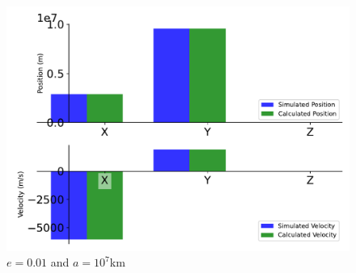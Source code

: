 \begin{figure}[htbp]\centerline{\includegraphics[height=0.7\textwidth, keepaspectratio]{AutoTeX/EquEllip_e_1}}\caption{$e = 0.01$ and $a = 10^7$km}\label{fig:EquEllip_e_1}\end{figure}